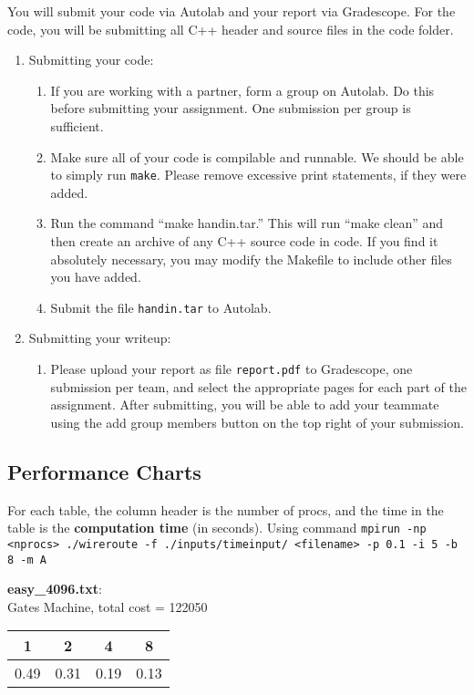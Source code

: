 \documentclass[11pt]{article}
\begin{document}
You will submit your code via Autolab and your report via Gradescope. For the code, you will be submitting all C++ header and source files in the code folder.

\begin{enumerate}
\item Submitting your code:
\begin{enumerate}
\item If you are working with a partner, form a group on Autolab. Do this before submitting your assignment. One submission per group is sufficient.
\item Make sure all of your code is compilable and runnable. We should be able to simply run \texttt{make}. Please remove excessive print statements, if they were added.
\item Run the command ``make handin.tar.'' This will run ``make clean'' and then create an archive of any C++ source code in code. If you find it absolutely necessary, you may modify the Makefile to include other files you have added.
\item Submit the file \texttt{handin.tar} to Autolab.
\end{enumerate}

\item Submitting your writeup:
\begin{enumerate}
\item Please upload your report as file \texttt{report.pdf} to Gradescope, one submission per team, and select the appropriate pages for each part of the assignment. After submitting, you will be able to add your teammate using the add group members button on the top right of your submission.
\end{enumerate}
\end{enumerate}

\subsection*{Performance Charts}

For each table, the column header is the number of procs, and the time in the table is the \textbf{computation time} (in seconds). Using command \texttt{mpirun -np <nprocs> ./wireroute -f ./inputs/timeinput/ <filename> -p 0.1 -i 5 -b 8 -m A}

\textbf{easy\_4096.txt}:\\ Gates Machine, total cost = 122050
\begin{table}[h!]
\centering
\label{tab:perf-easy}
\begin{tabular}{|c|c|c|c|}
\hline
1 & 2 & 4 & 8 \\
\hline
0.49 & 0.31 & 0.19 & 0.13 \\
\hline
\end{tabular}
\end{table}
\end{document}
